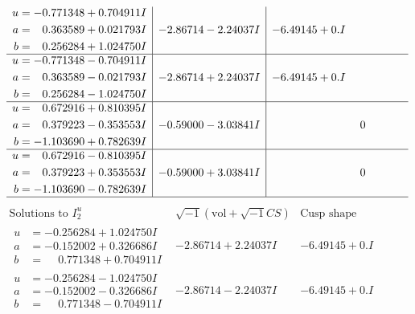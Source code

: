 \documentclass[1p]{elsarticle_modified}
\theoremstyle{definition}
\newcommand{\I}{\sqrt{-1}}
\begin{document}
$$\begin{array}{c|c|c}
\begin{aligned}
u &= -0.771348 + 0.704911 I \\
a &= \phantom{-}0.363589 + 0.021793 I \\
b &= \phantom{-}0.256284 + 1.024750 I\end{aligned}
 & -2.86714 - 2.24037 I & -6.49145 + 0. I\phantom{ +0.000000I} \\ \hline\begin{aligned}
u &= -0.771348 - 0.704911 I \\
a &= \phantom{-}0.363589 - 0.021793 I \\
b &= \phantom{-}0.256284 - 1.024750 I\end{aligned}
 & -2.86714 + 2.24037 I & -6.49145 + 0. I\phantom{ +0.000000I} \\ \hline\begin{aligned}
u &= \phantom{-}0.672916 + 0.810395 I \\
a &= \phantom{-}0.379223 - 0.353553 I \\
b &= -1.103690 + 0.782639 I\end{aligned}
 & -0.59000 - 3.03841 I & \phantom{-0.000000 } 0 \\ \hline\begin{aligned}
u &= \phantom{-}0.672916 - 0.810395 I \\
a &= \phantom{-}0.379223 + 0.353553 I \\
b &= -1.103690 - 0.782639 I\end{aligned}
 & -0.59000 + 3.03841 I & \phantom{-0.000000 } 0\\
 \hline 
 \end{array}$$\newpage$$\begin{array}{c|c|c}  
\text{Solutions to }I^u_{2}& \I (\text{vol} + \sqrt{-1}CS) & \text{Cusp shape}\\
 \hline 
\begin{aligned}
u &= -0.256284 + 1.024750 I \\
a &= -0.152002 + 0.326686 I \\
b &= \phantom{-}0.771348 + 0.704911 I\end{aligned}
 & -2.86714 + 2.24037 I & -6.49145 + 0. I\phantom{ +0.000000I} \\ \hline\begin{aligned}
u &= -0.256284 - 1.024750 I \\
a &= -0.152002 - 0.326686 I \\
b &= \phantom{-}0.771348 - 0.704911 I\end{aligned}
 & -2.86714 - 2.24037 I & -6.49145 + 0. I\phantom{ +0.000000I} \\ \hline\begin{aligned}

\end{aligned}
\end{array}$$
\end{document}
